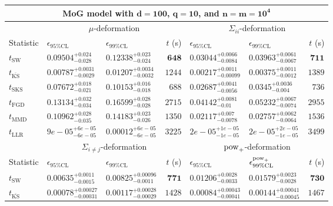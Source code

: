 \begin{tabular}{l|llr|llr}
	\toprule
	\multicolumn{7}{c}{{\bf MoG model with $\mathbf{d=100}$, $\mathbf{q=10}$, and $\mathbf{n=m=10^{4}}$}} \\
	\toprule
	\multicolumn{1}{c}{} & \multicolumn{3}{c}{$\mu$-deformation} & \multicolumn{3}{c}{$\Sigma_{ii}$-deformation} \\
	Statistic & $\epsilon_{95\%\mathrm{CL}}$ & $\epsilon_{99\%\mathrm    {CL}}$ & $t$ (s) & $\epsilon_{95\%\mathrm{CL}}$ & $\epsilon_{99\%\mathrm{CL}}$ & $t$ (s) \\
	\midrule
	$t_{\mathrm{SW}}$ & $0.09504_{-0.028}^{+0.024}$ & $0.12338_{-0.024}^{+0.023}$ & ${\mathbf{648}}$ & $0.03044_{-0.0084}^{+0.0066}$ & $0.03963_{-0.0067}^{+0.0061}$ & ${\mathbf{711}}$ \\
	$t_{\overline{\mathrm{KS}}}$ & ${\mathbf{0.00787_{-0.0029}^{+0.0031}}}$ & ${\mathbf{0.01207_{-0.0032}^{+0.0034}}}$ & $1244$ & ${\mathbf{0.00217_{-0.00099}^{+0.0011}}}$ & ${\mathbf{0.00375_{-0.0012}^{+0.0011}}}$ & $1389$ \\
	$t_{\mathrm{SKS}}$ & $0.07672_{-0.021}^{+0.018}$ & $0.10153_{-0.018}^{+0.016}$ & $688$ & $0.02687_{-0.0056}^{+0.0041}$ & $0.0345_{-0.004}^{+0.0036}$ & $736$ \\
	$t_{\mathrm{FGD}}$ & $0.13134_{-0.034}^{+0.032}$ & $0.16599_{-0.028}^{+0.028}$ & $2715$ & $0.04142_{-0.01}^{+0.0081}$ & $0.05232_{-0.0074}^{+0.0067}$ & $2955$ \\
	$t_{\mathrm{MMD}}$ & $0.10962_{-0.035}^{+0.028}$ & $0.14183_{-0.026}^{+0.023}$ & $1350$ & $0.02117_{-0.0078}^{+0.007}$ & $0.02757_{-0.0064}^{+0.0062}$ & $1536$ \\
	$t_{\mathrm{LLR}}$ & $9e-05_{-6e-05}^{+6e-05}$ & $0.00012_{-6e-05}^{+6e-05}$ & $3225$ & $2e-05_{-1e-05}^{+1e-05}$ & $2e-05_{-1e-05}^{+2e-05}$ & $3499$ \\
	\toprule
	\multicolumn{1}{c}{} & \multicolumn{3}{c}{$\Sigma_{i\neq j}$-deformation} & \multicolumn{3}{c}{$\rm{pow}_{+}$-deformation} \\
	Statistic & $\epsilon_{95\%\mathrm{CL}}$ & $\epsilon_{99\%\mathrm{CL}}$ & $t$ (s) & $\epsilon_{95\%\mathrm{CL}}$ & $\epsilon^{\rm   {pow}_{+}}_{99\%\mathrm{CL}}$ & $t$ (s) \\
	\midrule
	$t_{\mathrm{SW}}$ & $0.00635_{-0.0015}^{+0.0011}$ & $0.00825_{-0.0011}^{+0.00096}$ & ${\mathbf{771}}$ & $0.01206_{-0.0033}^{+0.0028}$ & $0.01579_{-0.0028}^{+0.0023}$ & ${\mathbf{730}}$ \\
	$t_{\overline{\mathrm{KS}}}$ & ${\mathbf{0.00078_{-0.00031}^{+0.00027}}}$ & ${\mathbf{0.00117_{-0.00029}^{+0.00028}}}$ & $1428$ & ${\mathbf{0.00084_{-0.00041}^{+0.00043}}}$ & ${\mathbf{0.00144_{-0.00045}^{+0.00041}}}$ & $1467$ \\

\end{tabular}
